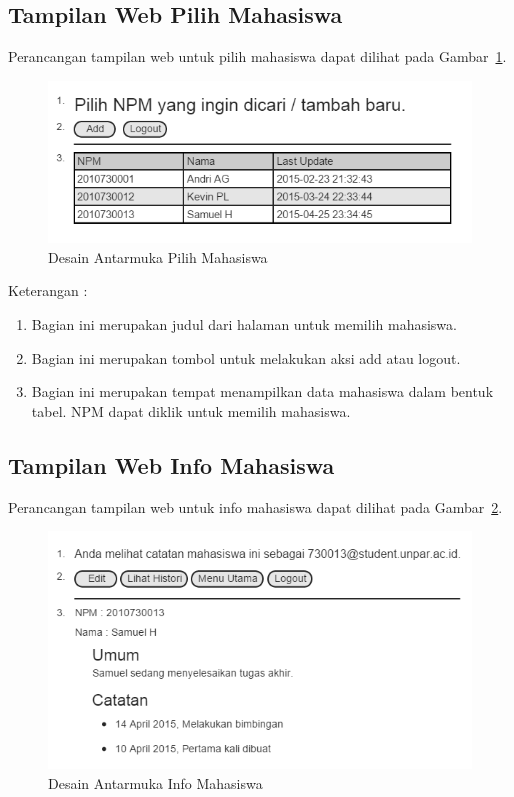 \subsection{Tampilan Web Pilih Mahasiswa}
Perancangan tampilan web untuk pilih mahasiswa dapat dilihat pada
Gambar~\ref{fig:pilihmahasiswa}.

\begin{figure}[H]
\centering
\includegraphics[scale=0.5]{Gambar/pilihmahasiswa.png}
\caption[Desain Antarmuka Pilih Mahasiswa]{Desain Antarmuka Pilih Mahasiswa}
\label{fig:pilihmahasiswa}
\end{figure}

Keterangan :
\begin{enumerate}[(1)]
\item
Bagian ini merupakan judul dari halaman untuk memilih mahasiswa.
\item
Bagian ini merupakan tombol untuk melakukan aksi add atau logout.
\item
Bagian ini merupakan tempat menampilkan data mahasiswa dalam bentuk tabel. NPM
dapat diklik untuk memilih mahasiswa.
\end{enumerate}

\subsection{Tampilan Web Info Mahasiswa}
Perancangan tampilan web untuk info mahasiswa dapat dilihat pada Gambar~\ref{fig:infomahasiswa}.
\begin{figure}[H]
\centering
\includegraphics[scale=0.5]{Gambar/infomahasiswa.png}
\caption[Desain Antarmuka Info Mahasiswa]{Desain Antarmuka Info Mahasiswa}
\label{fig:infomahasiswa}
\end{figure}

